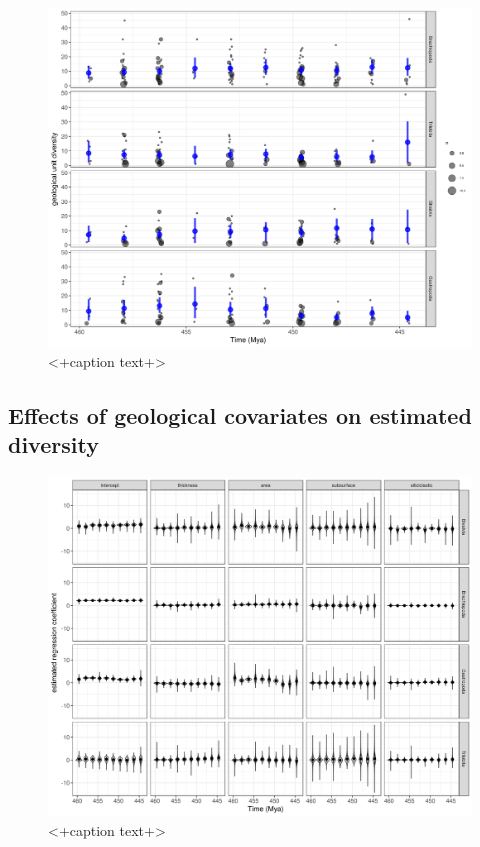 \documentclass[12pt,letterpaper]{article}
\begin{document}
\begin{figure}[ht]
  \centering
  \includegraphics[width=\textwidth,height=0.5\textheight,keepaspectratio=true]{figure/unitdiv_time}
  \caption{<+caption text+>}
  \label{fig:<+label+>}
\end{figure}



\subsection{Effects of geological covariates on estimated diversity}

\begin{figure}[ht]
  \centering
  \includegraphics[width=\textwidth,height=0.5\textheight,keepaspectratio=true]{figure/cov_time}
  \caption{<+caption text+>}
  \label{fig:<+label+>}
\end{figure}

\end{document}
